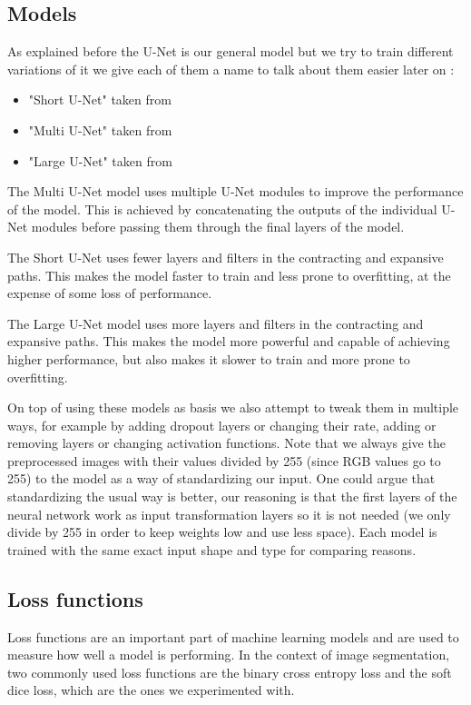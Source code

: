 \documentclass[10pt,conference,compsocconf]{IEEEtran}
\begin{document}
\subsection{Models}
\label{models}
As explained before the U-Net is our general model but we try to train different variations of it we give each of them a name to talk about them easier later on :
\begin{itemize}
\item "Short U-Net" taken from \cite{short-unet}
\item "Multi U-Net" taken from \cite{multi-unet}
\item "Large U-Net" taken from \cite{large-unet}
\end{itemize}
The Multi U-Net model uses multiple U-Net modules to improve the performance of the model. This is achieved by concatenating the outputs of the individual U-Net modules before passing them through the final layers of the model.

The Short U-Net uses fewer layers and filters in the contracting and expansive paths. This makes the model faster to train and less prone to overfitting, at the expense of some loss of performance.

The Large U-Net model uses more layers and filters in the contracting and expansive paths. This makes the model more powerful and capable of achieving higher performance, but also makes it slower to train and more prone to overfitting.

On top of using these models as basis we also attempt to tweak them in multiple ways, for example by adding dropout layers or changing their rate, adding or removing layers or changing activation functions.
Note that we always give the preprocessed images with their values divided by 255 (since RGB values go to 255) to the model as a way of standardizing our input. One could argue that standardizing the usual way is better, our reasoning is that the first layers of the neural network work as input transformation layers so it is not needed (we only divide by 255 in order to keep weights low and use less space). Each model is trained with the same exact input shape and type for comparing reasons.

\subsection{Loss functions}
Loss functions are an important part of machine learning models and are used to measure how well a model is performing. In the context of image segmentation, two commonly used loss functions are the binary cross entropy loss and the soft dice loss, which are the ones we experimented with.
\end{document}

